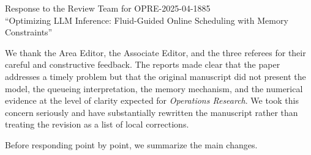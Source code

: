 \documentclass[11pt]{article}
\newcommand{\manuscript}{OPRE-2025-04-1885}
\newcommand{\papertitle}{Optimizing LLM Inference: Fluid-Guided Online Scheduling with Memory Constraints}
\begin{document}
\begin{center}
{\Large Response to the Review Team for \manuscript}\\[0.35em]
{\large ``\papertitle''}
\end{center}

\vspace{0.5em}

We thank the Area Editor, the Associate Editor, and the three referees for their careful and constructive feedback. The reports made clear that the paper addresses a timely problem but that the original manuscript did not present the model, the queueing interpretation, the memory mechanism, and the numerical evidence at the level of clarity expected for \emph{Operations Research}. We took this concern seriously and have substantially rewritten the manuscript rather than treating the revision as a list of local corrections.

Before responding point by point, we summarize the main changes.
\end{document}
